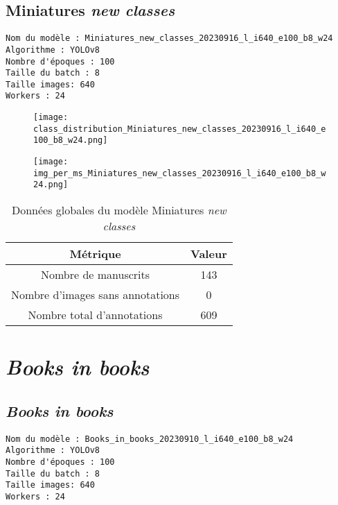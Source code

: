 \documentclass[12pt,twoside]{book}
\begin{document}
\newpage
\subsection{Miniatures \textit{new classes}}

\begin{verbatim}
Nom du modèle : Miniatures_new_classes_20230916_l_i640_e100_b8_w24
Algorithme : YOLOv8
Nombre d'époques : 100
Taille du batch : 8
Taille images: 640
Workers : 24
\end{verbatim}


\begin{figure}[ht]
    \centering
    \begin{minipage}[b]{0.45\textwidth}
        \centering
        \texttt{[image: class\_distribution\_Miniatures\_new\_classes\_20230916\_l\_i640\_e100\_b8\_w24.png]}
    \end{minipage}
    \hfill
    \begin{minipage}[b]{0.45\textwidth}
        \centering
        \texttt{[image: img\_per\_ms\_Miniatures\_new\_classes\_20230916\_l\_i640\_e100\_b8\_w24.png]}
    \end{minipage}
\end{figure}

\begin{center}
\begin{table}[ht]
    \centering
    \caption{Données globales du modèle Miniatures \textit{new classes}}
    \begin{tabular}{|c|c|}
    \hline
    \textbf{Métrique} & \textbf{Valeur} \\
    \hline
    Nombre de manuscrits & 143 \\ 
    \hline
    Nombre d'images sans annotations & 0 \\ 
    \hline
    Nombre total d'annotations & 609 \\ 
    \hline
    \end{tabular}
\end{table}    
\end{center}

\newpage
\section{\textit{Books in books}}
\subsection{\textit{Books in books}}

\begin{verbatim}
Nom du modèle : Books_in_books_20230910_l_i640_e100_b8_w24
Algorithme : YOLOv8
Nombre d'époques : 100
Taille du batch : 8
Taille images: 640
Workers : 24
\end{verbatim}
\end{document}

